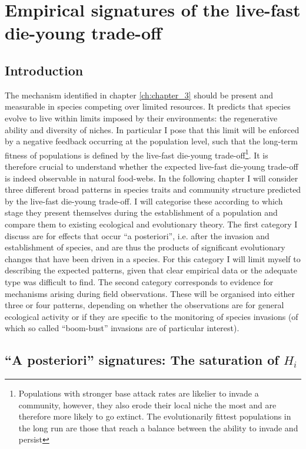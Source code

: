 \documentclass[a4paper]{report}
\begin{document}
\chapter{Empirical signatures of the live-fast die-young trade-off\label{ch:chapter_5}}

\section{Introduction}

The mechanism identified in chapter \ref{ch:chapter_3} should be present and measurable in species competing over limited resources. It predicts that species evolve to live within limits imposed by their environments: the regenerative ability and diversity of niches. In particular I pose that this limit will be enforced by a negative feedback occurring at the population level, such that the long-term fitness of populations is defined by the live-fast die-young trade-off\footnote{Populations with stronger base attack rates are likelier to invade a community, however, they also erode their local niche the most and are therefore more likely to go extinct. The evolutionarily fittest populations in the long run are those that reach a balance between the ability to invade and persist}. It is therefore crucial to understand whether the expected live-fast die-young trade-off is indeed observable in natural food-webs. In the following chapter I will consider three different broad patterns in species traits and community structure predicted by the live-fast die-young trade-off. I will categorise these according to which stage they present themselves during the establishment of a population and compare them to existing ecological and evolutionary theory. The first category I discuss are for effects that occur “a posteriori”, i.e. after the invasion and establishment of species, and are thus the products of significant evolutionary changes that have been driven in a species. For this category I will limit myself to describing the expected patterns, given that clear empirical data or the adequate type was difficult to find. The second category corresponds to evidence for mechanisms arising during field observations. These will be organised into either three or four patterns, depending on whether the observations are for general ecological activity or if they are specific to the monitoring of species invasions (of which so called “boom-bust” invasions are of particular interest).

\section{“A posteriori” signatures: The saturation of $H_i$}
\end{document}
